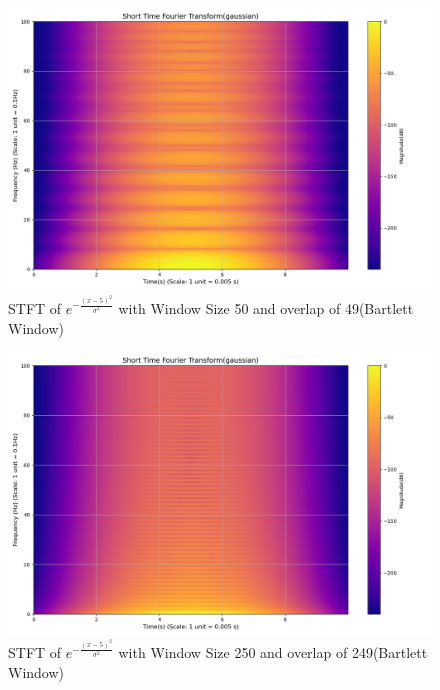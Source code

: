 \documentclass[12pt,a4paper,onecolumn]{exam}
\begin{document}
\begin{solution}
\begin{itemize}
\begin{itemize}
\begin{itemize}
        \end{itemize}

        \begin{figure}[H]
        \centering
        \includegraphics[scale = 0.35]{gaussian_1_50.0.png}
        \caption{STFT of $e^{-\frac{(x-5)^2}{\sigma^2}}$ with Window Size 50 and overlap of 49(Bartlett Window)}
        \label{fig:4}
        \end{figure}

        \begin{figure}[H]
        \centering
        \includegraphics[scale = 0.35 ]{gaussian_1_250.0.png}
        \caption{STFT of $e^{-\frac{(x-5)^2}{\sigma^2}}$ with Window Size 250 and overlap of 249(Bartlett Window)}
        \label{fig:5}
        \end{figure}


\end{itemize}
\end{itemize}
\end{solution}
\end{document}
